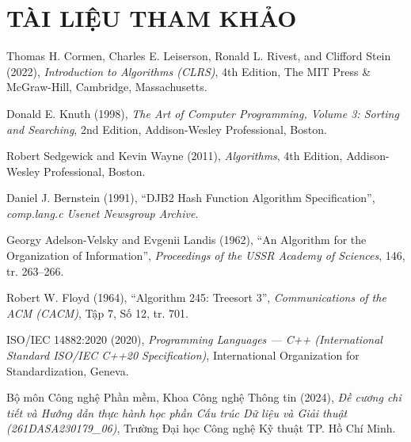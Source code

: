 \documentclass[14pt,a4paper]{extarticle}
\begin{document}
\section*{TÀI LIỆU THAM KHẢO}

\begin{enumerate}[label={[\arabic*]}, leftmargin=*, itemsep=6pt, parsep=0pt, topsep=4pt]
    \item Thomas H. Cormen, Charles E. Leiserson, Ronald L. Rivest, and Clifford Stein (2022), \textit{Introduction to Algorithms (CLRS)}, 4th Edition, The MIT Press \& McGraw-Hill, Cambridge, Massachusetts.

    \item Donald E. Knuth (1998), \textit{The Art of Computer Programming, Volume 3: Sorting and Searching}, 2nd Edition, Addison-Wesley Professional, Boston.

    \item Robert Sedgewick and Kevin Wayne (2011), \textit{Algorithms}, 4th Edition, Addison-Wesley Professional, Boston.

    \item Daniel J. Bernstein (1991), ``DJB2 Hash Function Algorithm Specification'', \textit{comp.lang.c Usenet Newsgroup Archive}.

    \item Georgy Adelson-Velsky and Evgenii Landis (1962), ``An Algorithm for the Organization of Information'', \textit{Proceedings of the USSR Academy of Sciences}, 146, tr. 263--266.

    \item Robert W. Floyd (1964), ``Algorithm 245: Treesort 3'', \textit{Communications of the ACM (CACM)}, Tập 7, Số 12, tr. 701.

    \item ISO/IEC 14882:2020 (2020), \textit{Programming Languages --- C++ (International Standard ISO/IEC C++20 Specification)}, International Organization for Standardization, Geneva.

    \item Bộ môn Công nghệ Phần mềm, Khoa Công nghệ Thông tin (2024), \textit{Đề cương chi tiết và Hướng dẫn thực hành học phần Cấu trúc Dữ liệu và Giải thuật (261DASA230179\_06)}, Trường Đại học Công nghệ Kỹ thuật TP. Hồ Chí Minh.
\end{enumerate}
\end{document}
